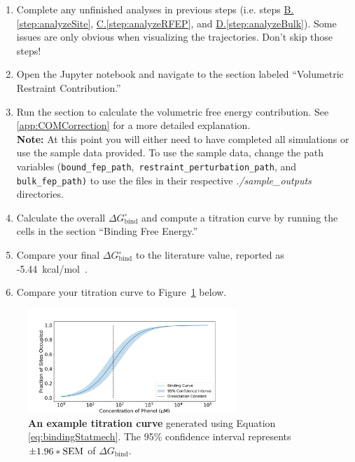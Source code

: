 \documentclass[9pt,tutorial]{Styling/livecoms}
\newcommand{\filepath}[1]{\textit{#1}}
\newcommand{\textInput}[1]{\texttt{#1}}
\begin{document}
    \begin{enumerate}
    \item Complete any unfinished analyses in previous steps (i.e. steps \hyperref[step:analyzeSite]{B.\ref{step:analyzeSite}}, \hyperref[step:analyzeRFEP]{C.\ref{step:analyzeRFEP}}, and \hyperref[step:analyzeBulk]{D.\ref{step:analyzeBulk}}).
    Some issues are only obvious when visualizing the trajectories. Don't skip those steps!
    \item Open the Jupyter notebook and navigate to the section labeled ``Volumetric Restraint Contribution.''
    \item Run the section to calculate the volumetric free energy contribution.\label{step:dGV}
    See \ref{app:COMCorrection} for a more detailed explanation.\\
    \textbf{Note:} At this point you will either need to have completed all simulations or use the sample data provided. To use the sample data, change the path variables (\textInput{bound\_fep\_path},\textInput{ restraint\_perturbation\_path}, and \textInput{bulk\_fep\_path\textrm{)}} to use the files in their respective \filepath{./sample\_outputs} directories. 
    \item Calculate the overall $\Delta G_\mathrm{bind}^\circ$ and compute a titration curve by running the cells in the section ``Binding Free Energy.''
    \item Compare your final $\Delta G_\mathrm{bind}^\circ$ to the literature value, reported as -5.44~kcal/mol~\cite{Merski2013}.
    \item Compare your titration curve to Figure~\ref{fig:titrationCurve} below.
\end{enumerate}

\begin{figure}[!htb]
    \centering
    \includegraphics[width=0.7\textwidth]{titration_curve}
    \caption{\textbf{An example titration curve} generated using Equation \ref{eq:bindingStatmech}. The 95\% confidence interval represents $\pm 1.96*\rm SEM$ of $\Delta G_\mathrm{bind}$.}
    \label{fig:titrationCurve}  
\end{figure}
\end{document}
